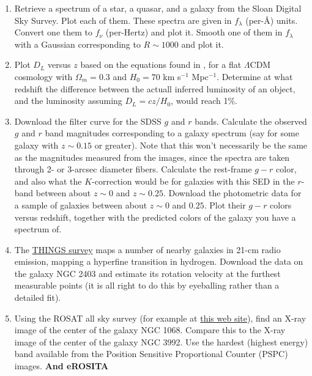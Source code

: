 \begin{enumerate}
\item Retrieve a spectrum of a star, a quasar, and a galaxy from the
  Sloan Digital Sky Survey. Plot each of them. These spectra are given
  in $f_\lambda$ (per-\AA) units. Convert one them to $f_\nu$
  (per-Hertz) and plot it. Smooth one of them in $f_\lambda$ with a
  Gaussian corresponding to $R\sim 1000$ and plot it.
\item Plot $D_L$ versus $z$ based on the equations found
  in \citet{hogg99cosm}, for a flat $\Lambda$CDM cosmology with
  $\Omega_m = 0.3$ and $H_0 = 70$ km s$^{-1}$ Mpc$^{-1}$. Determine at
  what redshift the difference between the actuall inferred luminosity
  of an object, and the luminosity assuming $D_L = cz / H_0$, would
  reach 1\%.
\item Download the filter curve for the SDSS $g$ and $r$
  bands. Calculate the observed $g$ and $r$ band magnitudes
  corresponding to a galaxy spectrum (say for some galaxy with $z \sim
  0.15$ or greater). Note that this won't necessarily be the same as
  the magnitudes measured from the images, since the spectra are taken
  through 2- or 3-arcsec diameter fibers. Calculate the rest-frame
  $g-r$ color, and also what the $K$-correction would be for galaxies
  with this SED in the $r$-band between about $z\sim 0$ and $z\sim
  0.25$. Download the photometric data for a sample of galaxies
  between about $z\sim 0$ and
  $0.25$. Plot their $g-r$ colors versus redshift, together with the
  predicted colors of the galaxy you have a spectrum of.
\item The \href{http://www.mpia.de/THINGS}{THINGS survey} maps a
  number of nearby galaxies in 21-cm radio emission, mapping a
  hyperfine transition in hydrogen. Download the data on the galaxy
  NGC 2403 and estimate its rotation velocity at the furthest
  measurable points (it is all right to do this by eyeballing rather
  than a detailed fit).
\item Using the ROSAT all sky survey (for example
  at \href{http://www.xray.mpe.mpg.de/cgi-bin/rosat/rosat-survey}{this
  web site}), find an X-ray image of the center of the galaxy NGC
  1068. Compare this to the X-ray image of the center of the galaxy
  NGC 3992. Use the hardest (highest energy) band available from the
  Position Sensitive Proportional Counter (PSPC) images. {\bf And
  eROSITA}
\end{enumerate}


  
